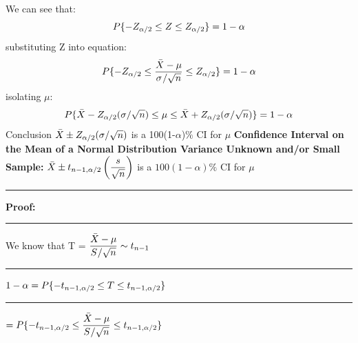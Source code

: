 \documentclass[]{article}
\begin{document}
\newline We can see that:
\newline 
\[  P \{ -Z_{\alpha\\/2} \le Z \le Z_{\alpha\\/2}  \}  = 1 - \alpha  \] 
\newline substituting Z into equation:
\[  P \{ -Z_{\alpha\\/2} \le \dfrac{\bar{X} - \mu}{\sigma \\/ \sqrt{n} }  \le Z_{\alpha\\/2}  \}  = 1 - \alpha  \] 
\newline isolating $\mu$:
\[  P \{ \bar{X}-Z_{\alpha\\/2} (\sigma \\/ \sqrt{n}) \le \mu \le \bar{X}+Z_{\alpha\\/2} (\sigma \\/ \sqrt{n})  \}   = 1 - \alpha  \] 
\newline Conclusion
$ \bar{X} \pm Z_{\alpha\\/2} (\sigma / \sqrt{n}) $ is a 100(1-$\alpha$)$\%$ CI for $\mu$ 
\newline
\Large\textbf{Confidence Interval on the Mean of a Normal Distribution
	\newline Variance Unknown and/or Small Sample:}
\newline
\newline $ \bar{X} \pm t_{n - 1, \alpha \\/ 2} \left(  \dfrac{s}{\sqrt{n}}  \right)$ is a $100(1-\alpha)\%$ CI for $\mu$
\newline
\newline\Large\rule{3.0cm}{0pt} \textbf{Proof:}
\newline\Large\rule{3.0cm}{0pt} We know that T = ${ \dfrac{\bar{X} - \mu}{ S \\/ \sqrt{n}}} \sim t_{n-1} $
\newline
\newline\Large\rule{3.0cm}{0pt}  $ 1- \alpha =  P \{ - t_{n - 1, \alpha \\/ 2} \le T \le t_{n - 1, \alpha \\/ 2}  \}$
\newline
\newline\Large\rule{4.3cm}{0pt}  $=  P \{ - t_{n - 1, \alpha \\/ 2} \le  \dfrac{\bar{X} - \mu}{ S \\/ \sqrt{n}}  \le t_{n - 1, \alpha \\/ 2}  \}$
\newline
\end{document}
